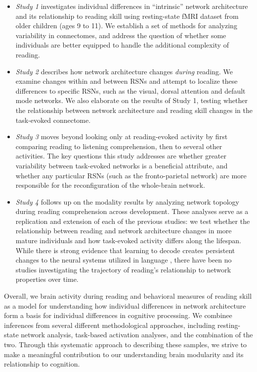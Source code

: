 \begin{itemize}

    \item \textit{Study 1} investigates individual differences in ``intrinsic'' network architecture and its relationship to reading skill using resting-state fMRI dataset from older children (ages 9 to 11). We establish a set of methods for analyzing variability in connectomes, and address the question of whether some individuals are better equipped to handle the additional complexity of reading. 

    \item \textit{Study 2} describes how network architecture changes \textit{during} reading. We examine changes within and between RSNs and attempt to localize these differences to specific RSNs, such as the visual, dorsal attention and default mode networks. We also elaborate on the results of Study 1, testing whether the relationship between network architecture and reading skill changes in the task-evoked connectome. 

    \item \textit{Study 3} moves beyond looking only at reading-evoked activity by first comparing reading to listening comprehension, then to several other activities. The key questions this study addresses are whether greater variability between task-evoked networks is a beneficial attribute, and whether any particular RSNs (such as the fronto-parietal network) are more responsible for the reconfiguration of the whole-brain network.

    \item \textit{Study 4} follows up on the modality results by analyzing network topology during reading comprehension across development. These analyses serve as a replication and extension of each of the previous studies: we test whether the relationship between reading and network architecture changes in more mature individuals and how task-evoked activity differs along the lifespan. While there is strong evidence that learning to decode creates persistent changes to the neural systems utilized in language \citep{Schlaggar2007}, there have been no studies investigating the trajectory of reading's relationship to network properties over time.

\end{itemize}

Overall, we brain activity during reading and behavioral measures of reading skill as a model for understanding how individual differences in network architecture form a basis for individual differences in cognitive processing. We combinee inferences from several different methodological approaches, including resting-state network analysis, task-based activation analyses, and the combination of the two. Through this systematic approach to describing these samples, we strive to make a meaningful contribution to our understanding brain modularity and its relationship to cognition.